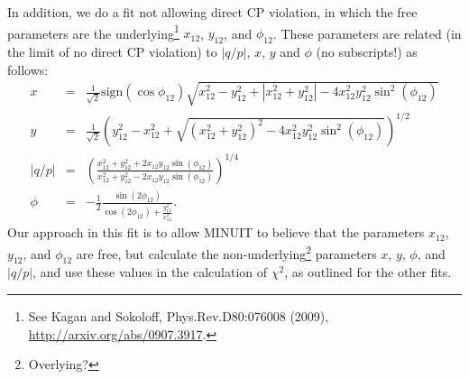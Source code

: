 In addition, we do a fit not allowing direct CP violation, in which the
free parameters are the underlying\footnote{See Kagan and Sokoloff, Phys.Rev.D80:076008 (2009), \url{http://arxiv.org/abs/0907.3917}.}
$x_{12}$, $y_{12}$, and $\phi_{12}$. These parameters are related
(in the limit of no direct CP violation) to $|q/p|$, $x$, $y$ and $\phi$ (no subscripts!) as follows:
\begin{eqnarray}
x &=& \frac{1}{\sqrt{2}}\mathrm{sign}(\cos\phi_{12})
\sqrt{x_{12}^2 - y_{12}^2 + |x_{12}^2+y_{12}^2| - 4x_{12}^2y_{12}^2\sin^2(\phi_{12})} \\
%
y &=& \frac{1}{\sqrt{2}}
\left(y_{12}^2 - x_{12}^2 + \sqrt{(x_{12}^2+y_{12}^2)^2 - 4x_{12}^2y_{12}^2\sin^2(\phi_{12})}\right)^{1/2} \\
%
|q/p| &=& \left(\frac{x_{12}^2+y_{12}^2+2x_{12}y_{12}\sin(\phi_{12})}
{x_{12}^2+y_{12}^2-2x_{12}y_{12}\sin(\phi_{12})}\right)^{1/4}\\
%
\phi &=& -\frac{1}{2}\frac{\sin(2\phi_{12})}{\cos(2\phi_{12})+\frac{y_{12}^2}{x_{12}^2}}.
\end{eqnarray}
Our approach in this fit is to allow MINUIT to believe that the parameters $x_{12}$, $y_{12}$,
and $\phi_{12}$ are free, but calculate the
non-underlying\footnote{Overlying?} parameters $x$, $y$, $\phi$, and $|q/p|$, and use these
values in the calculation of $\chi^2$, as outlined for the other fits. 


